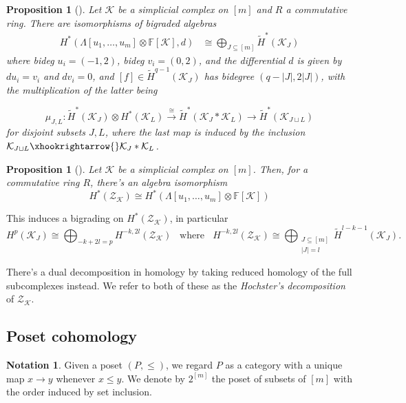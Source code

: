 \documentclass[a4paper]{amsart}
\newtheorem{prop}[thm]{Proposition}
\theoremstyle{definition}
\newtheorem{notation}[thm]{Notation}
\def\K{\mathcal{K}}
\def\H{\tilde{H}}
\def\ZZ{\mathcal{Z}}
\def\F{\mathbb{F}}
\begin{document}
\begin{prop}[{\cite{Hochster}}{\cite[\S3.2]{ToricTop}}]\label{Hochster}
     Let $\K$ be a simplicial complex on $[m]$ and $R$ a commutative ring. There are isomorphisms of bigraded algebras
     \begin{align*}
         H^* (\Lambda[u_1,\ldots,u_m]\otimes \F[\K],d)
         &\cong\bigoplus_{J\subseteq [m]}\H^*(\K_J)
     \end{align*}
     where bideg $u_i=(-1,2)$, bideg $v_i=(0,2)$, and the differential $d$ is given by $du_i=v_i$ and $dv_i=0$, and $[f]\in \H^{q-1}(\K_J)$ has bidegree $(q-|J|,2|J|)$, with the multiplication of the latter being 
     
    \[\mu_{J,L}:\H^*(\K_{J})\otimes H^*(\K_L)\xrightarrow[]{\cong}\H^*(\K_J*\K_L)\to \H^*(\K_{J\sqcup L})\] for disjoint subsets $J,L$, where the last map is induced by the inclusion  $\K_{J\sqcup L}\xhookrightarrow{}\K_J*\K_L$.
 \end{prop}
 \begin{prop}[\cite{ToricTop}]
        Let $\K$ be a simplicial complex on $[m]$. Then, for a commutative ring $R$, there's an algebra isomorphism
        \[H^*(\ZZ_\K)\cong H^*(\Lambda[u_1,\ldots,u_m]\otimes \F[\K])\]
 \end{prop}
 \noindent This induces a bigrading on $H^*(\ZZ_\K)$, in particular 
\[H^p(\K_J)\cong \bigoplus_{-k+2l=p}H^{-k,2l}(\ZZ_\K)\;\;\;\text{where }\;\;H^{-k,2l}(\ZZ_\K)\cong \bigoplus_{\substack{J\subseteq [m]\\|J|=l}}\H^{l-k-1}(\K_J).\]

There's a dual decomposition in homology by taking reduced homology of the full subcomplexes instead. We refer to both of these as the \textit{Hochster's decomposition} of $\ZZ_\K$.
\subsection{Poset cohomology}

\begin{notation}
    Given a poset $(P,\leq)$, we regard $P$ as a category with a unique map $x\to y$ whenever $x\leq y$. We denote by $2^{[m]}$ the poset of subsets of $[m]$ with the order induced by set inclusion.
\end{notation}
\end{document}
